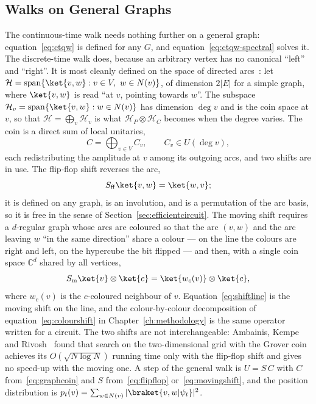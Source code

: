 \subsection{Walks on General Graphs}
\label{sec:dtqw-graphs}
The continuous-time walk needs nothing further on a general graph:
equation~\eqref{eq:ctqw} is defined for any $G$, and
equation~\eqref{eq:ctqw-spectral} solves it. The discrete-time walk does,
because an arbitrary vertex has no canonical ``left'' and ``right''. It is
most cleanly defined on the space of directed
arcs~\cite{Aharonov_2000, Kempe_2003, Portugal_2018}: let $\mathcal{H} =
\operatorname{span}\{\ket{v, w} : v \in V,\ w \in N(v)\}$, of dimension
$2|E|$ for a simple graph, where $\ket{v, w}$ is read ``at $v$, pointing
towards $w$''. The subspace $\mathcal{H}_v = \operatorname{span}\{\ket{v, w}
: w \in N(v)\}$ has dimension $\deg v$ and is the coin space at $v$, so that
$\mathcal{H} = \bigoplus_v \mathcal{H}_v$ is what $\mathcal{H}_P \otimes
\mathcal{H}_C$ becomes when the degree varies. The coin is a direct sum of
local unitaries,
\begin{equation}
	C = \bigoplus_{v \in V} C_v, \qquad C_v \in U(\deg v),
	\label{eq:graphcoin}
\end{equation}
each redistributing the amplitude at $v$ among its outgoing arcs, and two
shifts are in use. The flip-flop shift reverses the arc,
\begin{equation}
	S_{\mathrm{ff}} \ket{v, w} = \ket{w, v} ;
	\label{eq:flipflop}
\end{equation}
it is defined on any graph, is an involution, and is a permutation of the
arc basis, so it is free in the sense of
Section~\ref{sec:efficientcircuit}. The moving shift requires a $d$-regular
graph whose arcs are coloured so that the arc $(v, w)$ and the arc leaving
$w$ ``in the same direction'' share a colour --- on the line the colours are
right and left, on the hypercube the bit flipped --- and then, with a single
coin space $\mathbb{C}^d$ shared by all vertices,
\begin{equation}
	S_{\mathrm{m}} \ket{v} \otimes \ket{c} = \ket{w_c(v)} \otimes \ket{c},
	\label{eq:movingshift}
\end{equation}
where $w_c(v)$ is the $c$-coloured neighbour of $v$. Equation~\eqref{eq:shiftline}
is the moving shift on the line, and the colour-by-colour decomposition of
equation~\eqref{eq:colourshift} in Chapter~\ref{ch:methodology} is the same
operator written for a circuit. The two shifts are not interchangeable:
Ambainis, Kempe and Rivosh~\cite{Ambainis_2004} found that search on the
two-dimensional grid with the Grover coin achieves its $O(\sqrt{N\log N})$
running time only with the flip-flop shift and gives no speed-up with the
moving one. A step of the general walk is $U = S\,C$ with $C$
from~\eqref{eq:graphcoin} and $S$ from~\eqref{eq:flipflop}
or~\eqref{eq:movingshift}, and the position distribution is $p_t(v) =
\sum_{w \in N(v)} |\braket{v, w|\psi_t}|^2$.

